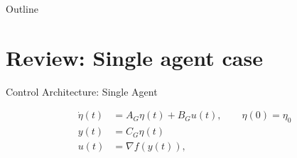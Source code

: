 \documentclass{beamer}
\begin{document}
\begin{frame}{Outline}
	\tableofcontents
\end{frame}
\section{Review: Single agent case}
\begin{frame}{Control Architecture: Single Agent}
\begin{figure}[ht]
	
	\label{fig:control_architecture}	
\end{figure}
	\begin{equation*} \label{eq:sys_dyn_G}
		\begin{split}
			\Dot{\eta}(t)&=A_G\eta(t) + B_G u(t), \quad \quad \eta(0)=\eta_0\\
			y(t)&=C_G \eta(t) \\
			u(t)&=\nabla f(y(t)),
		\end{split}
	\end{equation*}
\end{frame}
\end{document}
